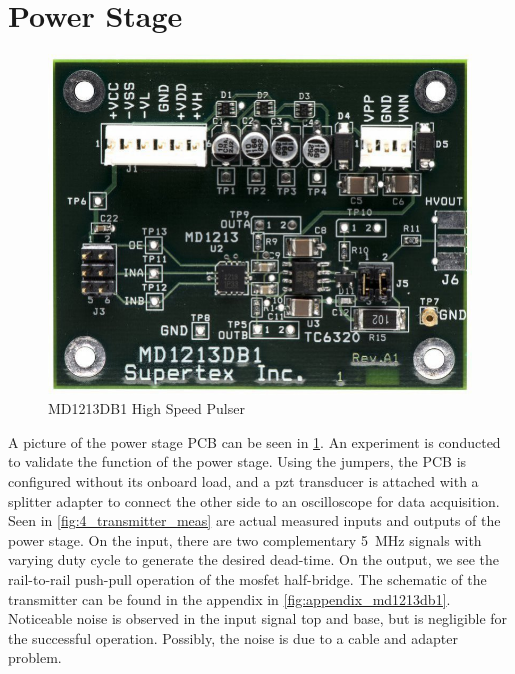 \section{Power Stage}
\begin{figure}[htbp]
	\centering
	\includegraphics[width=.8\textwidth]{Figures/4_transmitter_pcb_pic.jpg}
	\caption{MD1213DB1 High Speed Pulser}
	\label{fig:4_transmitter_pcb_pic}
\end{figure}
A picture of the power stage PCB can be seen in \cref{fig:4_transmitter_pcb_pic}. An experiment is conducted to validate the function of the power stage. Using the jumpers, the PCB is configured without its onboard load, and a \gls{pzt} transducer is attached with a splitter adapter to connect the other side to an oscilloscope for data acquisition. Seen in \cref{fig:4_transmitter_meas} are actual measured inputs and outputs of the power stage. On the input, there are two complementary \qty{5}{\mega\hertz} signals with varying duty cycle to generate the desired dead-time. On the output, we see the rail-to-rail push-pull operation of the \gls{mosfet} half-bridge. The schematic of the transmitter can be found in the appendix in \cref{fig:appendix_md1213db1}. Noticeable noise is observed in the input signal top and base, but is negligible for the successful operation. Possibly, the noise is due to a cable and adapter problem.
